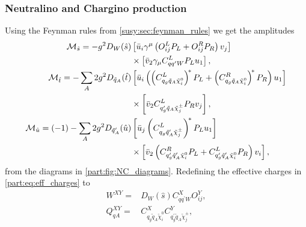 \documentclass[../main.tex]{subfiles}
\begin{document}
\begin{figure}[ht!]
  \centering
  \caption{}
  \label{part:fig:CC_diagrams}
\end{figure}

\subsubsection*{Neutralino and Chargino production}
Using the Feynman rules from \cref{susy:sec:feynman_rules} we get the amplitudes
\begin{subequations}
  \begin{align}
    \nonumber
    \M_{\hat{s}} = -g^2 D_W(\hat{s})                                & \bclosed{ \bar{u}_i\gamma^\mu\pclosed{O^{L}_{ij}P_L + O^{R}_{ij}P_R} v_j }
    \\
    \label{part:eq:NC_Ms}
                                                                    & \times \bclosed{ \bar{v}_2 \gamma_\mu C^L_{qq^\prime W}P_L u_1 },
    \\
    \nonumber
    \M_{\hat{t}} = -\sum_A 2g^2 D_{\tilde{q}_A}(\hat{t})            & \bclosed{ \bar{u}_i \pclosed{\pclosed{C_{q_g \tilde{q}_A \nino[i]}^L}^{\!\ast} P_L + \pclosed{C_{q_g \tilde{q}_A \nino[i]}^R}^{\!\ast} P_R} u_1 }
    \\
    \label{part:eq:NC_Mt}
                                                                    & \times \bclosed{ \bar{v}_2 C_{q^\prime_g \tilde{q}_A \tilde\chi^\pm_j}^L P_R v_j },
    \\
    \nonumber
    \M_{\hat{u}} = (-1)-\sum_A 2g^2 D_{\tilde{q}_A^\prime}(\hat{u}) & \bclosed{ \bar{u}_j \pclosed{C_{q_g \tilde{q}_A^\prime \tilde\chi^\pm_j}^L}^{\!\ast} P_L u_1 }
    \\
    \label{part:eq:NC_Mu}
                                                                    & \times \bclosed{ \bar{v}_2 \pclosed{C_{q_g^\prime \tilde{q}_A^\prime \nino[i]}^R P_L + C_{q_g^\prime \tilde{q}_A^\prime \nino[i]}^L P_R} v_i },
  \end{align}
\end{subequations}
from the diagrams in \cref{part:fig:NC_diagrams}.
Redefining the effective charges in \cref{part:eq:eff_charges} to
\begin{subequations}
  \begin{align*}
    W^{XY} =      & D_W(\hat{s}) C_{qq^\prime W}^X O_{ij}^Y,                                            \\
    Q_{qA}^{XY} = & C_{q_g \tilde{q}_A \tilde\chi^0_i}^X C_{q_g^\prime \tilde{q}_A \tilde\chi^\pm_j}^Y,
  \end{align*}
\end{subequations}
\end{document}
